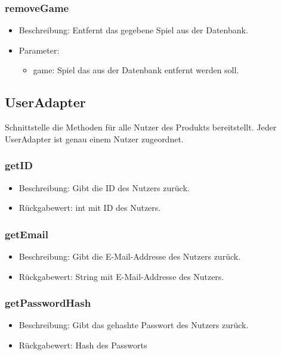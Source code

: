 \documentclass[a4paper]{scrreprt}
\begin{document}
	\subsubsection{removeGame}
	\begin{itemize}
		\item Beschreibung: Entfernt das gegebene Spiel aus der Datenbank.
		\item Parameter:
		\begin{itemize}
			\item game: Spiel das aus der Datenbank entfernt werden soll.
		\end{itemize}
	\end{itemize}

	\subsection{UserAdapter}
	Schnittstelle die Methoden für alle Nutzer des Produkts bereitstellt.
	Jeder UserAdapter ist genau einem Nutzer zugeordnet.

	\subsubsection{getID}
	\begin{itemize}
		\item Beschreibung: Gibt die ID des Nutzers zurück.
		\item Rückgabewert: int mit ID des Nutzers.
	\end{itemize}

	\subsubsection{getEmail}
	\begin{itemize}
		\item Beschreibung: Gibt die E-Mail-Addresse des Nutzers zurück.
		\item Rückgabewert: String mit E-Mail-Addresse des Nutzers.
	\end{itemize}

	\subsubsection{getPasswordHash}
	\begin{itemize}
		\item Beschreibung: Gibt das gehashte Passwort des Nutzers zurück.
		\item Rückgabewert: Hash des Passworts
	\end{itemize}
\end{document}
